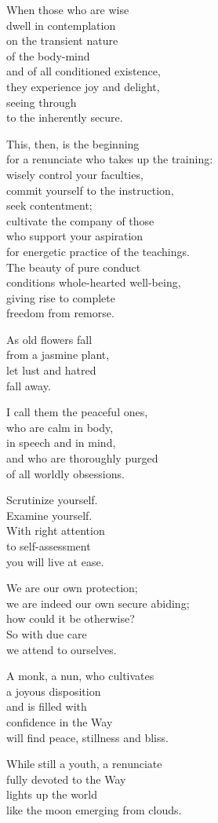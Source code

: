 When those who are wise\\
dwell in contemplation\\
on the transient nature\\
of the body-mind\\
and of all conditioned existence,\\
they experience joy and delight,\\
seeing through\\
to the inherently secure.


This, then, is the beginning\\
for a renunciate who takes up the training:\\
wisely control your faculties,\\
commit yourself to the instruction,\\
seek contentment;\\
cultivate the company of those\\
who support your aspiration\\
for energetic practice of the teachings.\\
The beauty of pure conduct\\
conditions whole-hearted well-being,\\
giving rise to complete\\
freedom from remorse.


As old flowers fall\\
from a jasmine plant,\\
let lust and hatred\\
fall away.


I call them the peaceful ones,\\
who are calm in body,\\
in speech and in mind,\\
and who are thoroughly purged\\
of all worldly obsessions.


Scrutinize yourself.\\
Examine yourself.\\
With right attention\\
to self-assessment\\
you will live at ease.


We are our own protection;\\
we are indeed our own secure abiding;\\
how could it be otherwise?\\
So with due care\\
we attend to ourselves.


A monk, a nun, who cultivates\\
a joyous disposition\\
and is filled with\\
confidence in the Way\\
will find peace, stillness and bliss.


While still a youth, a renunciate\\
fully devoted to the Way\\
lights up the world\\
like the moon emerging from clouds.

